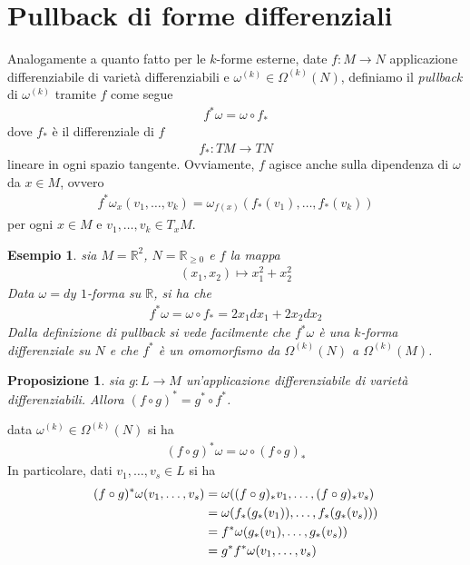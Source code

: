 \documentclass[twoside, 11pt]{amsbook}
\makeatletter
\newcommand{\0}{{(0)}}
\newcommand{\3}{{(3)}}
\theoremstyle{colonplain}
\newtheorem{prop}[thm]{Proposizione}
\theoremstyle{colondefinition}
\newtheorem{ex}[thm]{Esempio}
\theoremstyle{colonremark}
\numberwithin{equation}{chapter}
\renewcommand{\proofname}{Dimostrazione}
\renewenvironment{proof}[1][\proofname]{\par
  \pushQED{\qed}%
  \normalfont \topsep6\p@\@plus6\p@\relax
  \trivlist
  \item[\hskip\labelsep\bfseries #1:]\ignorespaces
}{%
  \popQED\endtrivlist\@endpefalse
}
\makeatother
\begin{document}
\section{Pullback di forme differenziali}
Analogamente a quanto fatto per le $k$-forme esterne, date $f : M \longrightarrow N$ applicazione differenziabile di varietà differenziabili e $\omega^{(k)} \in \Omega^{(k)}(N)$, definiamo il \textit{pullback} di $\omega^{(k)}$ tramite $f$ come segue
\begin{align}
    f^*\omega = \omega \circ f_* 
\end{align}
dove $f_*$ è il differenziale di $f$
\begin{align}
    f_* : TM \longrightarrow TN 
\end{align}
lineare in ogni spazio tangente. Ovviamente, $f$ agisce anche sulla dipendenza di $\omega$ da $x \in M$, ovvero
\begin{align}
    f^*\omega_x(v_1, \dots, v_k) = \omega_{f(x)}(f_*(v_1), \dots, f_*(v_k)) 
\end{align}
per ogni $x \in M$ e $v_1, \dots, v_k \in T_xM$.
\begin{ex} sia $M = \mathbb{R}^2$, $N = \mathbb{R}_{\geq 0}$ e $f$ la mappa
\begin{align}
    (x_1, x_2) \mapsto x^2_1 + x^2_2 
\end{align}
Data $\omega = dy$ $1$-forma su $\mathbb{R}$, si ha che 
\begin{align}
    f^*\omega = \omega \circ f_* = 2x_1dx_1 + 2x_2dx_2 
\end{align}
Dalla definizione di pullback si vede facilmente che $f^*\omega$ è una $k$-forma differenziale su $N$ e che $f^*$ è un omomorfismo da $\Omega^{(k)}(N)$ a $\Omega^{(k)}(M)$.
\end{ex}
\begin{prop} sia $g : L \longrightarrow M$ un'applicazione differenziabile di varietà differenziabili. Allora $(f \circ g)^* = g^* \circ f^*$.
\end{prop}

\begin{proof} data $\omega^{(k)} \in \Omega^{(k)}(N)$ si ha
\begin{align}
    (f \circ g)^*\omega = \omega \circ (f \circ g)_* 
\end{align}
In particolare, dati $v_1, \dots, v_s \in L$ si ha
\begin{align}
    (f \circ g)^*\omega(v_1, \dots, v_s) &= \omega((f \circ g)_*v_1, \dots, (f \circ g)_*v_s) \notag \\
    &= \omega(f_*(g_*(v_1)), \dots, f_*(g_*(v_s))) \notag \\
    &= f^*\omega(g_*(v_1), \dots, g_*(v_s)) \notag \\
    &= g^*f^*\omega(v_1, \dots, v_s) 
\end{align} \end{proof}
\end{document}
